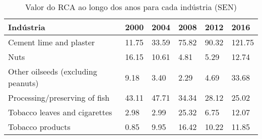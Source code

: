 \begin{table}
\centering
\caption{Valor do RCA ao longo dos anos para cada indústria (SEN)}
\label{tab:ex3-tempo-SEN}
\begin{tabular}{p{6cm}p{1.5cm}p{1.5cm}p{1.5cm}p{1.5cm}p{1.5cm}}
\toprule
                         Indústria &  2000 &  2004 &  2008 &  2012 &   2016 \\
\midrule
           Cement lime and plaster & 11.75 & 33.59 & 75.82 & 90.32 & 121.75 \\
                              Nuts & 16.15 & 10.61 &  4.81 &  5.29 &  12.74 \\
Other oilseeds (excluding peanuts) &  9.18 &  3.40 &  2.29 &  4.69 &  33.68 \\
     Processing/preserving of fish & 43.11 & 47.71 & 34.34 & 28.12 &  25.02 \\
     Tobacco leaves and cigarettes &  2.98 &  2.99 & 25.32 &  6.75 &  12.07 \\
                  Tobacco products &  0.85 &  9.95 & 16.42 & 10.22 &  11.85 \\
\bottomrule
\end{tabular}
\end{table}
